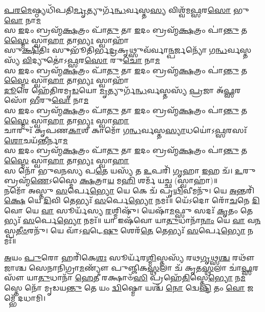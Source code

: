 \-\ul{𑌪}\-\-\ul{𑌰}\-\-\ul{𑌮𑍇}\-𑌷𑍍𑌠𑍍𑌯𑌧𑌿᳴𑌪𑌤𑌿\-\ul{𑌰𑍍𑌮𑍃}\-𑌤𑍍𑌯𑍁𑌰𑍍𑌗᳴\-\ul{𑌨𑍍𑌧}\-𑌰𑍍𑌵𑌸𑍍𑌤\-\ul{𑌸𑍍𑌯} 𑌵𑌿𑌶𑍍𑌵᳴𑌮\-\ul{𑌫𑍍𑌸}\-𑌰\-\ul{𑌸𑍋} 𑌭𑍁\-\ul{𑌵𑍋}  𑌨𑌾\-\ul{𑌮}\-\\
𑌸 \ul{𑌇}\-𑌦𑌂 𑌬𑍍𑌰𑌹𑍍𑌮᳴\-\ul{𑌕𑍍𑌷}\-𑌤𑍍𑌰𑌂 𑌪𑌾᳴\-\ul{𑌤𑍁} 𑌤𑌾 \ul{𑌇}\-𑌦𑌂 𑌬𑍍𑌰𑌹𑍍𑌮᳴\-\ul{𑌕𑍍𑌷}\-𑌤𑍍𑌰𑌂 𑌪𑌾॑\-\ul{𑌨𑍍𑌤𑍁} 𑌤\-\ul{𑌸𑍍𑌮𑍈} 𑌸𑍍𑌵𑌾\-\ul{𑌹𑌾} 𑌤𑌾\-\ul{𑌭𑍍𑌯𑌃} 𑌸𑍍𑌵𑌾𑌹𑌾᳴\\
𑌸𑍁\-\ul{𑌕𑍍𑌷𑌿}\-𑌤𑌿𑌃 𑌸𑍁𑍁𑌭𑍂᳴𑌤𑌿𑌰𑍍𑌭\-\ul{𑌦𑍍𑌰}\-𑌕𑍃𑌥𑍍𑌸𑍁𑌵᳴𑌰𑍍𑌵𑌾\-\ul{𑌨𑍍𑌪}\-𑌰𑍍𑌜𑌨𑍍𑌯𑍋᳴ 𑌗\-\ul{𑌨𑍍𑌧}\-𑌰𑍍𑌵𑌸𑍍𑌤𑌸𑍍𑌯᳴ \ul{𑌵𑌿}\-𑌦𑍍𑌯𑍁𑌤𑍋॑𑌽\-\ul{𑌫𑍍𑌸}\-𑌰\-\ul{𑌸𑍋} 𑌰𑍁\-\ul{𑌚𑍋} 𑌨𑌾\-\ul{𑌮}\-\\
𑌸 \ul{𑌇}\-𑌦𑌂 𑌬𑍍𑌰𑌹𑍍𑌮᳴\-\ul{𑌕𑍍𑌷}\-𑌤𑍍𑌰𑌂 𑌪𑌾᳴\-\ul{𑌤𑍁} 𑌤𑌾 \ul{𑌇}\-𑌦𑌂 𑌬𑍍𑌰𑌹𑍍𑌮᳴\-\ul{𑌕𑍍𑌷}\-𑌤𑍍𑌰𑌂 𑌪𑌾॑\-\ul{𑌨𑍍𑌤𑍁} 𑌤\-\ul{𑌸𑍍𑌮𑍈} 𑌸𑍍𑌵𑌾\-\ul{𑌹𑌾} 𑌤𑌾\-\ul{𑌭𑍍𑌯𑌃} 𑌸𑍍𑌵𑌾𑌹𑌾᳴\\
\-\ul{𑌦𑍂}\-𑌰𑍇 𑌹𑍇᳴𑌤𑌿𑌰𑌮𑍃\-\ul{𑌡}\-𑌯𑍋 \ul{𑌮𑍃}\-𑌤𑍍𑌯𑍁𑌰𑍍𑌗᳴\-\ul{𑌨𑍍𑌧}\-𑌰𑍍𑌵𑌸𑍍𑌤𑌸𑍍𑌯᳴ \ul{𑌪𑍍𑌰}\-𑌜𑌾 𑌅᳴\-\ul{𑌫𑍍𑌸}\-𑌰𑌸𑍋᳴ \ul{𑌭𑍀}\-𑌰𑍁\-\ul{𑌵𑍋} 𑌨𑌾\-\ul{𑌮}\-\\
𑌸 \ul{𑌇}\-𑌦𑌂 𑌬𑍍𑌰𑌹𑍍𑌮᳴\-\ul{𑌕𑍍𑌷}\-𑌤𑍍𑌰𑌂 𑌪𑌾᳴\-\ul{𑌤𑍁} 𑌤𑌾 \ul{𑌇}\-𑌦𑌂 𑌬𑍍𑌰𑌹𑍍𑌮᳴\-\ul{𑌕𑍍𑌷}\-𑌤𑍍𑌰𑌂 𑌪𑌾॑\-\ul{𑌨𑍍𑌤𑍁} 𑌤\-\ul{𑌸𑍍𑌮𑍈} 𑌸𑍍𑌵𑌾\-\ul{𑌹𑌾} 𑌤𑌾\-\ul{𑌭𑍍𑌯𑌃} 𑌸𑍍𑌵𑌾\-\ul{𑌹𑌾}\-\\
𑌚𑌾𑌰𑍁𑌃᳴ 𑌕𑍃𑌪𑌣\-\ul{𑌕𑌾}\-𑌶𑍀 𑌕𑌾𑌮𑍋᳴ 𑌗\-\ul{𑌨𑍍𑌧}\-𑌰𑍍𑌵𑌸𑍍𑌤\-\ul{𑌸𑍍𑌯𑌾}\-𑌧𑌯𑍋॑𑌽\-\ul{𑌫𑍍𑌸}\-𑌰𑌸𑌃᳴ \ul{𑌶𑍋}\-𑌚𑌯᳴\-\ul{𑌨𑍍𑌤𑍀}\-𑌰𑍍𑌨𑌾\-\ul{𑌮}\-\\
𑌸 \ul{𑌇}\-𑌦𑌂 𑌬𑍍𑌰𑌹𑍍𑌮᳴\-\ul{𑌕𑍍𑌷}\-𑌤𑍍𑌰𑌂 𑌪𑌾᳴\-\ul{𑌤𑍁} 𑌤𑌾 \ul{𑌇}\-𑌦𑌂 𑌬𑍍𑌰𑌹𑍍𑌮᳴\-\ul{𑌕𑍍𑌷}\-𑌤𑍍𑌰𑌂 𑌪𑌾॑\-\ul{𑌨𑍍𑌤𑍁} 𑌤\-\ul{𑌸𑍍𑌮𑍈} 𑌸𑍍𑌵𑌾\-\ul{𑌹𑌾} 𑌤𑌾\-\ul{𑌭𑍍𑌯𑌃} 𑌸𑍍𑌵𑌾\-\ul{𑌹𑌾}\-\\
𑌸 𑌨𑍋᳴ 𑌭𑍁𑌵𑌨𑌸𑍍𑌯 𑌪\-\ul{𑌤𑍇} 𑌯𑌸𑍍𑌯᳴ 𑌤 \ul{𑌉}\-𑌪𑌰𑌿᳴ \ul{𑌗𑍃}\-𑌹𑌾 \ul{𑌇}\-𑌹 𑌚᳴।
\-\ul{𑌉}\-𑌰𑍁 𑌬𑍍𑌰𑌹𑍍𑌮᳴\-\ul{𑌣𑍇}\-𑌽𑌸𑍍𑌮𑍈 \ul{𑌕𑍍𑌷}\-𑌤𑍍𑌰𑌾\-\ul{𑌯} 𑌮\-\ul{𑌹𑌿} 𑌶𑌰𑍍𑌮᳴ 𑌯𑌚𑍍𑌛 (𑌸𑍍𑌵𑌾𑌹𑌾॑)॥\\
𑌨𑌮𑍋᳴ 𑌅𑌸𑍍𑌤𑍁 \ul{𑌸}\-𑌰𑍍𑌪𑍇\-\ul{𑌭𑍍𑌯𑍋} 𑌯𑍇 𑌕𑍇 𑌚᳴ 𑌪𑍃\-\ul{𑌥𑌿}\-𑌵𑍀𑌮𑌨𑍁᳴।
𑌯𑍇 \ul{𑌅}\-𑌨𑍍𑌤𑌰𑌿᳴\-\ul{𑌕𑍍𑌷𑍇} 𑌯𑍇 \ul{𑌦𑌿}\-𑌵𑌿  𑌤𑍇𑌭𑍍𑌯𑌃᳴ \ul{𑌸}\-𑌰𑍍𑌪𑍇\-\ul{𑌭𑍍𑌯𑍋} 𑌨𑌮𑌃᳴॥
𑌯𑍇᳴𑌽𑌦𑍋 𑌰𑍋᳴\-\ul{𑌚}\-𑌨𑍇 \ul{𑌦𑌿}\-𑌵𑍋 𑌯𑍇 \ul{𑌵𑌾} 𑌸𑍂𑌰𑍍𑌯᳴𑌸𑍍𑌯 \ul{𑌰}\-𑌶𑍍𑌮𑌿𑌷𑍁᳴।
𑌯𑍇𑌷𑌾᳴\-\ul{𑌮}\-𑌫𑍍𑌸𑍁 𑌸𑌦𑌃᳴ \ul{𑌕𑍃}\-𑌤𑌂 𑌤𑍇𑌭𑍍𑌯𑌃᳴ \ul{𑌸}\-𑌰𑍍𑌪𑍇\-\ul{𑌭𑍍𑌯𑍋} 𑌨𑌮𑌃᳴॥
𑌯𑌾 𑌇𑌷᳴𑌵𑍋 𑌯𑌾\-\ul{𑌤𑍁}\-𑌧𑌾𑌨𑌾᳴\-\ul{𑌨𑌾𑌂} 𑌯𑍇 \ul{𑌵𑌾} 𑌵\-\ul{𑌨}\-𑌸𑍍𑌪\-\ul{𑌤𑍀}\-\-\ul{𑍞}\-𑌰𑌨𑍁᳴।
𑌯𑍇 𑌵𑌾᳴𑌽\-\ul{𑌵}\-𑌟𑍇\-\ul{𑌷𑍁} 𑌶𑍇𑌰᳴\-\ul{𑌤𑍇} 𑌤𑍇𑌭𑍍𑌯𑌃᳴ \ul{𑌸}\-𑌰𑍍𑌪𑍇\-\ul{𑌭𑍍𑌯𑍋} 𑌨𑌮𑌃᳴॥

\-\ul{𑌅}\-𑌯𑌂 \ul{𑌪𑍁}\-𑌰𑍋 𑌹𑌰𑌿᳴𑌕𑍇\-\ul{𑌶𑌃} 𑌸𑍂𑌰𑍍𑌯᳴𑌰\-\ul{𑌶𑍍𑌮𑌿}\-𑌸𑍍𑌤𑌸𑍍𑌯᳴ 𑌰𑌥\-\ul{𑌗𑍃}\-𑌥𑍍𑌸\-\ul{𑌶𑍍𑌚} 𑌰𑌥𑍗᳴𑌜𑌾𑌶𑍍𑌚 𑌸𑍇𑌨𑌾𑌨𑌿𑌗𑍍𑌰𑌾\-\ul{𑌮}\-𑌣𑍍𑌯𑍗᳴
𑌪𑍁𑌞𑍍𑌜𑌿𑌕\-\ul{𑌸𑍍𑌥}\-𑌲𑌾 𑌚᳴ 𑌕𑍃𑌤\-\ul{𑌸𑍍𑌥}\-𑌲𑌾 𑌚𑌾॑\-\ul{𑌫𑍍𑌸}\-𑌰𑌸𑍗᳴ 𑌯𑌾\-\ul{𑌤𑍁}\-𑌧𑌾𑌨𑌾᳴ \ul{𑌹𑍇}\-𑌤𑍀 𑌰𑌕𑍍𑌷𑌾𑍞᳴\-\ul{𑌸𑌿} 
𑌪𑍍𑌰𑌹𑍇᳴\-\ul{𑌤𑌿}\-𑌸𑍍𑌤𑍇\-\ul{𑌭𑍍𑌯𑍋} 𑌨\-\ul{𑌮}\-𑌸𑍍𑌤𑍇 𑌨𑍋᳴ 𑌮𑍃𑌡𑌯\-\ul{𑌨𑍍𑌤𑍁} 𑌤𑍇 𑌯𑌂 \ul{𑌦𑍍𑌵𑌿}\-𑌷𑍍𑌮𑍋 𑌯𑌶𑍍𑌚᳴ \ul{𑌨𑍋} 𑌦𑍍𑌵𑍇\-\ul{𑌷𑍍𑌟𑌿} 𑌤𑌂 \ul{𑌵𑍋}  𑌜𑌮𑍍𑌭𑍇᳴ 𑌦𑌧𑌾𑌮𑌿।


